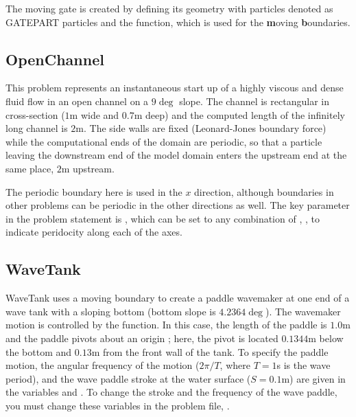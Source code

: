 \documentclass[12pt]{memoir}
\begin{document}
The moving gate is created by defining its geometry with particles
denoted as GATEPART particles and the  function, which
is used for the \textbf{m}oving \textbf{b}oundaries.

\subsection{OpenChannel}

This problem represents an instantaneous start up of a highly viscous
and dense fluid flow in an open channel on a $9\deg$ slope. The
channel is rectangular in cross-section ($1$m wide and $0.7$m deep) and
the computed length of the infinitely long channel is $2$m. The side
walls are fixed (Leonard-Jones boundary force) while the computational
ends of the domain are periodic, so that a particle leaving the
downstream end of the model domain enters the upstream end at the same
place, $2$m upstream.

The periodic boundary here is used in the $x$ direction, although
boundaries in other problems can be periodic in the other directions as
well. The key parameter in the problem statement is
, which can be set to any combination of
, ,  to indicate
peridocity along each of the axes.


\subsection{WaveTank}

WaveTank uses a moving boundary to create a paddle wavemaker at one end
of a wave tank with a sloping bottom (bottom slope is $4.2364\deg$). The
wavemaker motion is controlled by the  function. In
this case, the length of the paddle is $1.0$m and the paddle pivots
about an origin ; here, the pivot is located $0.1344$m
below the bottom and $0.13$m from the front wall of the tank. To specify
the paddle motion, the angular frequency of the motion ($2 \pi/T$, where
$T=1$s is the wave period), and the wave paddle stroke at the water
surface ($S=0.1$m) are given in the variables  and
. To change the stroke and the frequency of the wave
paddle, you must change these variables in the problem file,
.

\iffalse
\begin{figure}[h]
\centering{%
\texttt{[image: paddle.png]}%
}
\caption{Schematic of the wave paddle for \cmd{WaveTank.cc}}
\end{figure}
\else
{}
\fi
\end{document}

